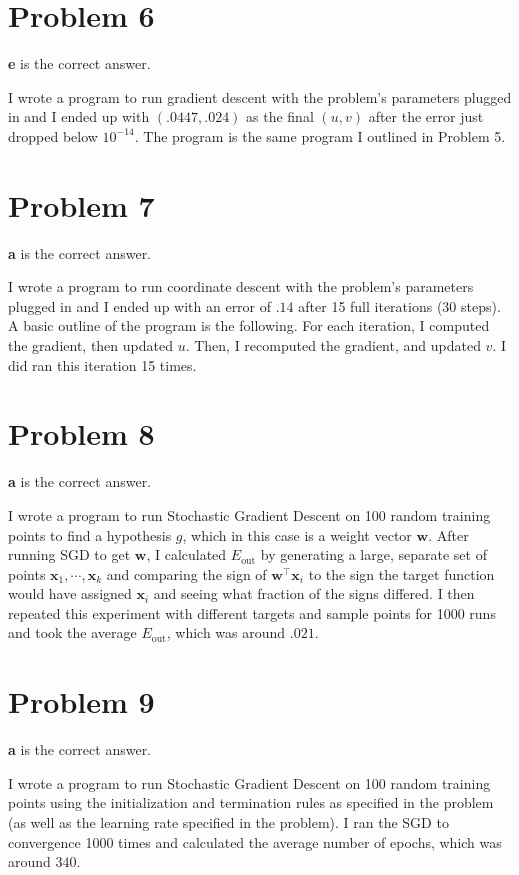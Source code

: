 \documentclass{article}
\begin{document}
\section*{Problem 6}
\textbf{e} is the correct answer.

\noindent I wrote a program to run gradient descent with the problem's
parameters plugged in and I ended up with $(.0447, .024)$ as the final
$(u,v)$ after the error just dropped below $10^{-14}$. The program is the
same program I outlined in Problem 5.

\section*{Problem 7}
\textbf{a} is the correct answer.

\noindent I wrote a program to run coordinate descent with the problem's
parameters plugged in and I ended up with an error of $.14$ after 15 full
iterations (30 steps). A basic outline of the program is the following. For
each iteration, I computed the gradient, then updated $u$. Then, I recomputed
the gradient, and updated $v$. I did ran this iteration 15 times.

\section*{Problem 8}
\textbf{a} is the correct answer.

\noindent I wrote a program to run Stochastic Gradient Descent on 100 random
training points to find a hypothesis $g$, which in this case is a weight
vector $\mathbf{w}$. After running SGD to get $\mathbf{w}$, I calculated
$E_{\text{out}}$ by generating a large, separate set of points
$\mathbf{x}_1, \cdots, \mathbf{x}_k$ and comparing
the sign of $\mathbf{w}^{\intercal}\mathbf{x}_i$ to the sign the target function
would have assigned $\mathbf{x}_i$ and seeing what fraction of the signs differed.
I then repeated this experiment with different targets and sample points
for 1000 runs and took the average $E_{\text{out}}$, which was around $.021$.

\section*{Problem 9}
\textbf{a} is the correct answer.

\noindent I wrote a program to run Stochastic Gradient Descent on 100 random
training points using the initialization and termination rules as specified
in the problem (as well as the learning rate specified in the problem).
I ran the SGD to convergence 1000 times and calculated the average number of
epochs, which was around $340$.
\end{document}
